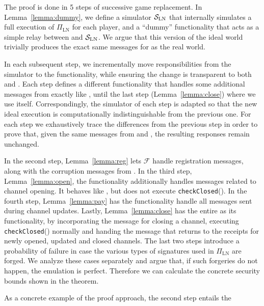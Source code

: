   \begin{proofsketch}
    The proof is done in 5 steps of successive game replacement. In
    Lemma~\ref{lemma:dummy}, we define a simulator $\mathcal{S}_{\mathrm{LN}}$
    that internally
    simulates a full execution of $\Pi_{\mathrm{LN}}$ for each player, and a
    ``dummy'' functionality that acts as a simple relay between \environment{}
    and $\mathcal{S}_{\mathrm{LN}}$. We argue that this version of the ideal
    world trivially produces the exact same messages for \environment{} as the
    real world.

    In each subsequent step, we incrementally move responsibilities from the
    simulator to the functionality, while ensuring the change is transparent to
    both \environment{} and \adversary. Each step defines a different
    functionality that handles some additional messages from \environment{}
    exactly like \fpaynet, until the last step (Lemma~\ref{lemma:close}) where
    we use \fpaynet{} itself.
    Correspondingly, the simulator of each step is adapted so that the new ideal
    execution is computationally indistinguishable from the previous one. For
    each step we exhaustively trace the differences from the previous step in
    order to prove that, given the same messages from \environment{} and
    \adversary{}, the resulting responses remain unchanged.

    In the second step, Lemma~\ref{lemma:reg} lets $\mathcal{F}$ handle
    registration messages, along with the corruption messages from \simulator.
    In the third step, Lemma~\ref{lemma:open}, the
    functionality additionally handles messages related to channel opening. It
    behaves like \fpaynet, but does not execute \texttt{checkClosed}(). In the
    fourth step, Lemma~\ref{lemma:pay} has the functionality handle all messages
    sent during channel updates. Lastly, Lemma~\ref{lemma:close} has the entire
    \fpaynet{} as its
    functionality, by incorporating the message for closing a channel, executing
    \texttt{checkClosed}() normally and handing the message that returns to
    \environment{} the receipts for newly opened, updated and closed channels.
    The last two steps introduce a probability of failure in case the various
    types of signatures used in $\Pi_{\mathrm{LN}}$ are forged. We analyze these
    cases separately and argue that, if such forgeries do not happen, the
    emulation is perfect. Therefore we can calculate the concrete security
    bounds shown in the theorem.
  \end{proofsketch}
  As a concrete example of the proof approach, the second step entails the
